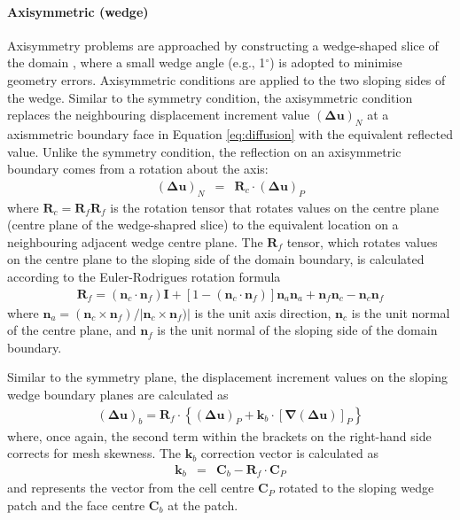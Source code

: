 \documentclass[sn-mathphys,Numbered]{sn-jnl}%
\newcommand{\bb}{\boldsymbol}
\begin{document}
\paragraph{Axisymmetric (wedge)}
Axisymmetry problems are approached by constructing a wedge-shaped slice of the domain \citep{greenshieldsweller2022}, where a small wedge angle (e.g., 1$^\circ$) is adopted to minimise geometry errors.
Axisymmetric conditions are applied to the two sloping sides of the wedge.
Similar to the symmetry condition, the axisymmetric condition replaces the neighbouring displacement increment value $\left(\bb{\Delta} \bb{u}\right)_N$ at a axismmetric boundary face in Equation \ref{eq:diffusion} with the equivalent reflected value.
Unlike the symmetry condition, the reflection on an axisymmetric boundary comes from a rotation about the axis:
\begin{eqnarray}
	\left(\bb{\Delta} \bb{u}\right)_N &=& \bb{R}_c \cdot \left(\bb{\Delta} \bb{u}\right)_P
\end{eqnarray}
where $\bb{R}_c = \bb{R}_f \bb{R}_f$ is the rotation tensor that rotates values on the centre plane (centre plane of the wedge-shapred slice) to the equivalent location on a neighbouring adjacent wedge centre plane.
The $\bb{R}_f$ tensor, which rotates values on the centre plane to the sloping side of the domain boundary, is calculated according to the Euler-Rodrigues rotation formula \citep{greenshieldsweller2022, rodrigues1815attraction}
\begin{eqnarray}
	\bb{R}_f = (\bb{n}_c \cdot \bb{n}_f) \mathbf{I} + \left[1 - (\bb{n}_c \cdot \bb{n}_f) \right] \bb{n}_a \bb{n}_a + \bb{n}_f \bb{n}_c - \bb{n}_c \bb{n}_f
\end{eqnarray}
where $\bb{n}_a = (\bb{n}_c \times \bb{n}_f)/|\bb{n}_c \times \bb{n}_f)|$ is the unit axis direction, $\bb{n}_c$ is the unit normal of the centre plane, and $\bb{n}_f$ is the unit normal of the sloping side of the domain boundary.

Similar to the symmetry plane, the displacement increment values on the sloping wedge boundary planes are calculated as
\begin{eqnarray}
	\left(\bb{\Delta} \bb{u}\right)_b =
		\bb{R}_f \cdot
		\left\{
			\left(\bb{\Delta} \bb{u}\right)_P + \bb{k}_b  \cdot \left[ \bb{\nabla} \left(\bb{\Delta} \bb{u}\right) \right]_P 
		\right\}
\end{eqnarray}
where, once again, the second term within the brackets on the right-hand side corrects for mesh skewness.
The $\bb{k}_b$ correction vector is calculated as
\begin{eqnarray}
	 \bb{k}_b &=& \bb{C}_b - \bb{R}_f \cdot \bb{C}_P
\end{eqnarray}
and represents the vector from the cell centre $\bb{C}_P$ rotated to the sloping wedge patch and the face centre $\bb{C}_b$ at the patch.
\end{document}

